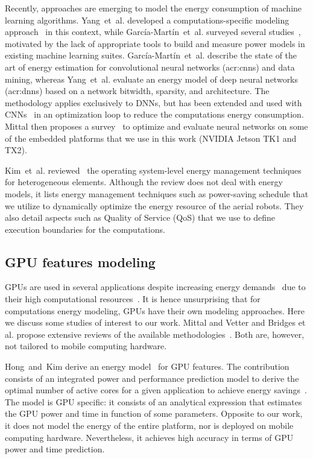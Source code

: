 Recently, approaches are emerging to model the energy consumption of machine learning algorithms.
Yang~et~al. developed a computations-specific modeling approach~\citep{yang2017method} in this context, while Garc{\'i}a-Mart{\'i}n~et~al. surveyed several studies~\citep{garcia2019estimation}, motivated by the lack of appropriate tools to build and measure power models in existing machine learning suites. Garc{\'i}a-Mart{\'i}n~et~al. describe the state of the art of energy estimation for convolutional neural networks (\Gls{acr:cnn}s) and data mining, whereas Yang~et~al. evaluate an energy model of deep neural networks (\Gls{acr:dnn}s) based on a network bitwidth, sparsity, and architecture. The methodology applies exclusively to DNNs, but has been extended and used with CNNs~\citep{yang2017designing} in an optimization loop to reduce the computations energy consumption. Mittal then proposes a survey~\citep{mittal2019survey} to optimize and evaluate neural networks on some of the embedded platforms that we use in this work (NVIDIA Jetson TK1 and TX2). 

Kim~et~al. reviewed~\citep{kim2018survey} the operating system-level energy management techniques for heterogeneous elements. Although the review does not deal with energy models, it lists energy management techniques such as power-saving schedule that we utilize to dynamically optimize the energy resource of the aerial robots. They also detail aspects such as Quality of Service (QoS) that we use to define execution boundaries for the computations.

\subsection{GPU features modeling}

GPUs are used in several applications despite increasing energy demands~\citep{mittal2014survey} due to their high computational resources~\citep{kasichayanula2012power}. It is hence unsurprising that for computations energy modeling, GPUs have their own modeling approaches. Here we discuss some studies of interest to our work. Mittal and Vetter and Bridges et al. propose extensive reviews of the available methodologies~\citep{bridges2016understanding,mittal2014survey}. Both are, however, not tailored to mobile computing hardware.

Hong~and~Kim derive an energy model~\citep{hong2010integrated} for GPU features. The contribution consists of an integrated power and performance prediction model to derive the optimal number of active cores for a given application to achieve energy savings~\citep{hong2010integrated}. The model is GPU specific: it consists of an analytical expression that estimates the GPU power and time in function of some parameters. Opposite to our work, it does not model the energy of the entire platform, nor is deployed on mobile computing hardware. Nevertheless, it achieves high accuracy in terms of GPU power and time prediction.

